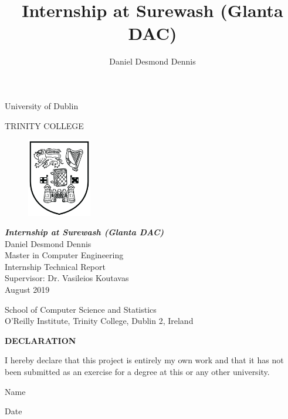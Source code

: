 \begin{center}
    \title{Internship at Surewash (Glanta DAC)}
    \author{Daniel Desmond Dennis}
    {\huge University of Dublin}

    \vspace*{0.5in}
    
    {\Huge TRINITY COLLEGE}

    \vspace*{0.5in}

    \begin{figure}[h]
      \begin{center}
        \includegraphics[width=1.1in]{../img/tcd_old_logo.png}
      \end{center}
    \end{figure}

    

    \vspace*{1.0in}
    {\Large \bfseries \slshape
    Internship at Surewash (Glanta DAC)\\
    }
    \vspace*{1.0in}
    {
    Daniel Desmond Dennis\\
    Master in Computer Engineering\\
    Internship Technical Report\\
    Supervisor: Dr. Vasileios Koutavas\\
    August 2019
    }

    \setcounter{section}{0}

    \vfill

    {\Large
    School of Computer Science and Statistics\\

    O’Reilly Institute, Trinity College, Dublin 2, Ireland
    }

\end{center}

\newpage

\begin{center}
{\bfseries \large DECLARATION}\\
\end{center}
\vspace*{0.5in}
I hereby declare that this project is entirely my own work and that it has not been submitted as an exercise for a degree at this or any other university.
\vspace*{0.5in}

\newcommand*\wildcard[2][5cm]{\vspace*{2cm}\parbox{#1}{\hrulefill\par#2}}

\begingroup
  \centering
  \wildcard{Name}
  \hspace{1cm}
  \wildcard{Date}
  \par
\endgroup
